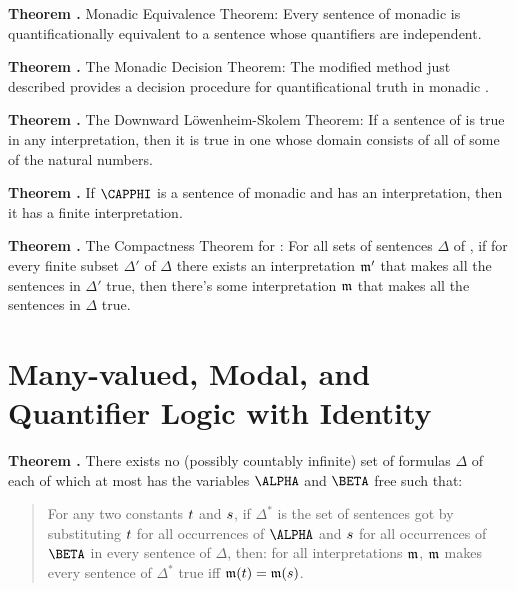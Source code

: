 \begin{majorILnc}{\textbf{Theorem .} Monadic \GQL{} Equivalence Theorem:}
Every sentence of monadic \GQL{} is quantificationally equivalent to a sentence whose quantifiers are independent.
\end{majorILnc}

\begin{majorILnc}{\textbf{Theorem .} The Monadic Decision Theorem:}
The modified method just described provides a decision procedure for quantificational truth in monadic \GQL{}.
\end{majorILnc}

\begin{majorILnc}{\textbf{Theorem .} The Downward L\"owenheim-Skolem Theorem:}
If a sentence of \GQL{} is true in any interpretation, then it is true in one whose domain consists of all of some of the natural numbers.
\end{majorILnc}

\begin{majorILnc}{\textbf{Theorem .}}
If $\CAPPHI$ is a sentence of monadic \GQL{} and has an interpretation, then it has a finite interpretation.
\end{majorILnc}

\begin{majorILnc}{\textbf{Theorem .} The Compactness Theorem for \GQL{}:}
For all sets of sentences $\Delta$ of \GQL{}, if for every finite subset $\Delta'$ of $\Delta$ there exists an interpretation $\mathfrak{m}'$ that makes all the sentences in $\Delta'$ true, then there's some interpretation $\mathfrak{m}$ that makes all the sentences in $\Delta$ true. 
\end{majorILnc}

\section*{Many-valued, Modal, and Quantifier Logic with Identity}

\begin{majorILnc}{\textbf{Theorem .}}
There exists no (possibly countably infinite) set of formulas $\Delta$ of \GQL{} each of which at most has the variables $\ALPHA$ and $\BETA$ free such that:
\begin{quote}
For any two constants $t$ and $s$, if $\Delta^*$ is the set of sentences got by substituting $t$ for all occurrences of $\ALPHA$ and $s$ for all occurrences of $\BETA$ in every sentence of $\Delta$, then: for all interpretations $\mathfrak{m}$, $\mathfrak{m}$ makes every sentence of $\Delta^*$ true iff $\mathfrak{m}(t)=\mathfrak{m}(s)$.
\end{quote}
\end{majorILnc}

